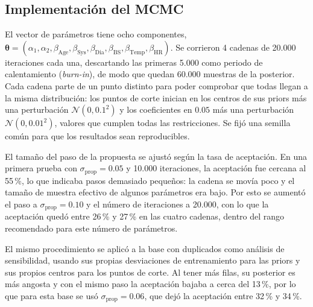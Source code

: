 \subsection{Implementación del MCMC}
El vector de parámetros tiene ocho componentes,
$\boldsymbol{\theta}=(\alpha_1,\alpha_2,\beta_{\mathrm{Age}},\beta_{\mathrm{Sys}},
\beta_{\mathrm{Dia}},\beta_{\mathrm{BS}},\beta_{\mathrm{Temp}},\beta_{\mathrm{HR}})$.
Se corrieron 4 cadenas de 20.000 iteraciones cada una, descartando las primeras
5.000 como periodo de calentamiento (\emph{burn-in}), de modo que quedan 60.000
muestras de la posterior. Cada cadena parte de un punto distinto para poder
comprobar que todas llegan a la misma distribución: los puntos de corte inician
en los centros de sus priors más una perturbación $\mathcal{N}(0,0.1^2)$ y los
coeficientes en $0.05$ más una perturbación $\mathcal{N}(0,0.01^2)$, valores que
cumplen todas las restricciones. Se fijó una semilla común para que los
resultados sean reproducibles.

El tamaño del paso de la propuesta se ajustó según la tasa de aceptación. En una
primera prueba con $\sigma_{\mathrm{prop}}=0.05$ y 10.000 iteraciones, la
aceptación fue cercana al 55\,\%, lo que indicaba pasos demasiado pequeños: la
cadena se movía poco y el tamaño de muestra efectivo de algunos parámetros era
bajo. Por esto se aumentó el paso a $\sigma_{\mathrm{prop}}=0.10$ y el número de
iteraciones a 20.000, con lo que la aceptación quedó entre 26\,\% y 27\,\% en las
cuatro cadenas, dentro del rango recomendado para este número de parámetros.

El mismo procedimiento se aplicó a la base con duplicados como análisis de
sensibilidad, usando sus propias desviaciones de entrenamiento para las priors
y sus propios centros para los puntos de corte. Al tener más filas, su posterior
es más angosta y con el mismo paso la aceptación bajaba a cerca del 13\,\%, por
lo que para esta base se usó $\sigma_{\mathrm{prop}}=0.06$, que dejó la
aceptación entre 32\,\% y 34\,\%.
